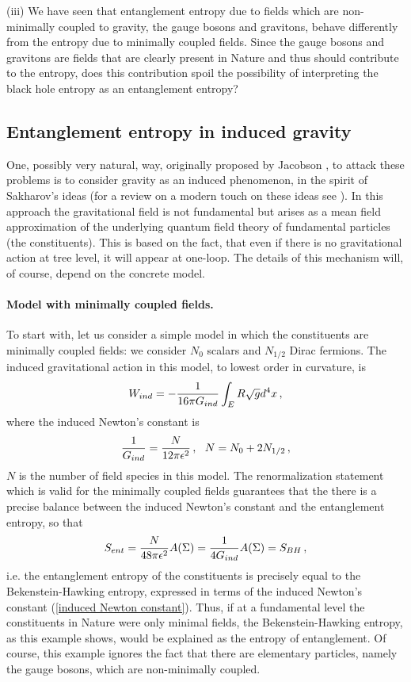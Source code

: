 \documentclass[12pt]{article}
\def\be{\begin{eqnarray}}
\def\ee{\end{eqnarray}}
\def\lb{\label}
\def\o{\over}
\begin{document}
\medskip

\noindent (iii) We have seen that entanglement entropy due to fields which are non-minimally coupled to gravity, the gauge bosons and gravitons, behave differently from the entropy due to minimally coupled fields.  Since the gauge bosons and gravitons are  fields that are clearly present in Nature  and thus should contribute to the entropy, does this contribution  spoil 
the possibility of interpreting  the black hole entropy as an entanglement entropy?


\subsection{Entanglement entropy in induced gravity}

One, possibly very natural, way, originally proposed by Jacobson \cite{Jacobson:1994iw},  to attack these problems is to consider gravity as an induced phenomenon, in the spirit of Sakharov's ideas \cite{Sakharov:1967pk} (for a review on a modern touch on these ideas see \cite{Visser:2002ew}). 
In this approach the gravitational field is not fundamental but arises as a mean field approximation of the underlying quantum field theory of fundamental particles (the constituents). 
This is based on the fact, that even if there is no gravitational action at tree level, it will appear at one-loop.  The details of this mechanism will, of course, depend on the
concrete model. 


\paragraph*{Model with minimally coupled fields.} 

To start with, let us consider a simple model in which the constituents are minimally coupled fields: we consider $N_0$ scalars and $N_{1/2}$ Dirac fermions. The induced gravitational action in this model, to lowest order in curvature, is 
\be
W_{ind}=-{1\over 16\pi G_{ind}}\int_E R\sqrt{g} d^4x\, , 
\lb{induced action}
\ee
where the induced Newton's constant is
\be
 {1\o G_{ind}}={N\o 12\pi\epsilon^2}\, , \ \ N=N_0+2N_{1/2}\, ,
\lb{induced Newton constant}
\ee
$N$ is the number of field species in this model.  The renormalization statement which is valid for the minimally coupled fields guarantees that the there is a precise balance between
the induced Newton's constant and the entanglement entropy, so that 
\be
S_{ent}={N\over 48\pi\epsilon^2}A(\Sigma)={1\over 4 G_{ind}}A(\Sigma)=S_{BH}\, ,
\lb{entanglement=BH}
\ee
i.e. the entanglement entropy of the constituents is precisely equal to the Bekenstein-Hawking entropy, expressed in terms of the induced Newton's constant (\ref{induced Newton constant}).
Thus, if at a fundamental level the constituents in Nature were only minimal fields, the Bekenstein-Hawking entropy, as this example shows, would be explained as the entropy of entanglement. Of course, this example ignores the fact that there are elementary particles, namely the gauge bosons, which are non-minimally coupled.
\end{document}
